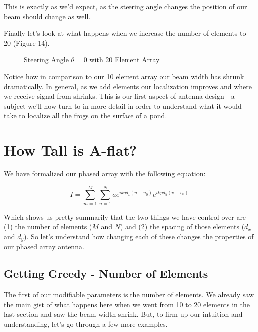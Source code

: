 \documentclass[10pt,a4paper]{article}
\begin{document}
This is exactly as we'd expect, as the steering angle changes the position of our beam should change as well. 

Finally let's look at what happens when we increase the number of elements to 20 (Figure 14).

\begin{figure}[!htb]
\caption{\label{fig:my-label} Steering Angle $\theta=0$ with 20 Element Array}
\end{figure}

Notice how in comparison to our 10 element array our beam width has shrunk dramatically. In general, as we add elements our localization improves and where we receive signal from shrinks. This is our first aspect of antenna design - a subject we'll now turn to in more detail in order to understand what it would take to localize all the frogs on the surface of a pond. 

\newpage


\section{How Tall is A-flat?}
We have formalized our phased array with the following equation:

\begin{equation}
I=\sum_{m=1}^M \sum_{n=1}^N  ae^{ikqd_x(u-u_0)}e^{ikpd_y(v-v_0)}
\end{equation}

Which shows us pretty summarily that the two things we have control over are (1) the number of elements ($M$ and $N$) and (2) the spacing of those elements ($d_x$ and $d_y$). So let's understand how changing each of these changes the properties of our phased array antenna. 

\subsection{Getting Greedy - Number of Elements}
The first of our modifiable parameters is the number of elements. We already saw the main gist of what happens here when we went from 10 to 20 elements in the last section and saw the beam width shrink. But, to firm up our intuition and understanding, let's go through a few more examples. 
\end{document}
